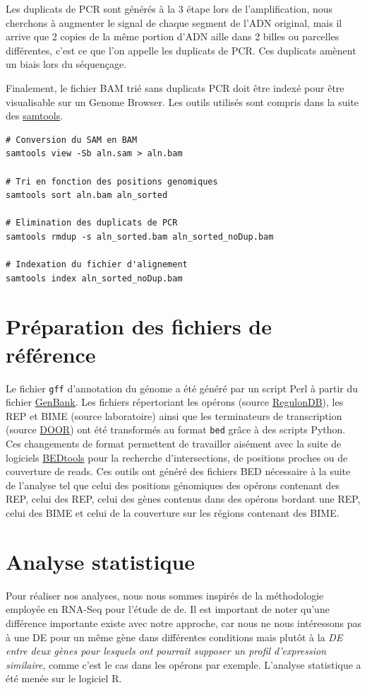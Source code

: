 \documentclass[12pt,a4paper]{report}
\begin{document}
\begin{onehalfspace}
Les duplicats de PCR sont générés à la 3\ieme{} étape lors de l'amplification, nous cherchons à augmenter le
signal de chaque segment de l'ADN original, mais il arrive que 2 copies de la même portion d'ADN
aille dans 2 billes ou parcelles différentes, c'est ce que l'on appelle les duplicats de PCR. Ces duplicats
amènent un biais lors du séquençage.

Finalement, le fichier BAM trié sans duplicats PCR doit être indexé pour être visualisable sur un Genome Browser. Les outils utilisés sont compris dans la suite des \href{http://samtools.sourceforge.net/samtools.shtml}{samtools}.
\begin{lstlisting}[frame=single]
# Conversion du SAM en BAM
samtools view -Sb aln.sam > aln.bam

# Tri en fonction des positions genomiques
samtools sort aln.bam aln_sorted

# Elimination des duplicats de PCR
samtools rmdup -s aln_sorted.bam aln_sorted_noDup.bam

# Indexation du fichier d'alignement
samtools index aln_sorted_noDup.bam
\end{lstlisting}

\section*{Préparation des fichiers de référence}
Le fichier \texttt{\gls{gff}} d'annotation du génome a été généré par un script Perl à partir du fichier \href{http://www.ncbi.nlm.nih.gov/nuccore/NC_000913.2}{GenBank}. Les fichiers répertoriant les opérons (source \href{http://regulondb.ccg.unam.mx/}{RegulonDB}), les REP et BIME (source laboratoire) ainsi que les terminateurs de transcription (source \href{http://csbl.bmb.uga.edu/DOOR/}{DOOR}) ont été transformés au format \texttt{\gls{bed}} grâce à des scripts Python.
Ces changements de format permettent de travailler aisément avec la suite de logiciels \href{http://bedtools.readthedocs.org/en/latest/}{BEDtools} pour la recherche d'intersections, de positions proches ou de couverture de reads. Ces outils ont généré des fichiers BED nécessaire à la suite de l'analyse tel que celui des positions génomiques des opérons contenant des REP, celui des REP, celui des gènes contenus dans des opérons bordant une REP, celui des BIME et celui de la couverture sur les régions contenant des BIME.

\section*{Analyse statistique}
Pour réaliser nos analyses, nous nous sommes inspirés de la méthodologie employée en RNA-Seq pour l'étude de \gls{de}. Il est important de noter qu'une différence importante existe avec notre approche, car nous ne nous intéressons pas à une DE pour un m\^eme gène dans différentes conditions mais plut\^ot à la \emph{DE entre deux gènes pour lesquels ont pourrait supposer un profil d'expression similaire}, comme c'est le cas dans les opérons par exemple.
L'analyse statistique a été menée sur le logiciel R.


\end{onehalfspace}
\end{document}
